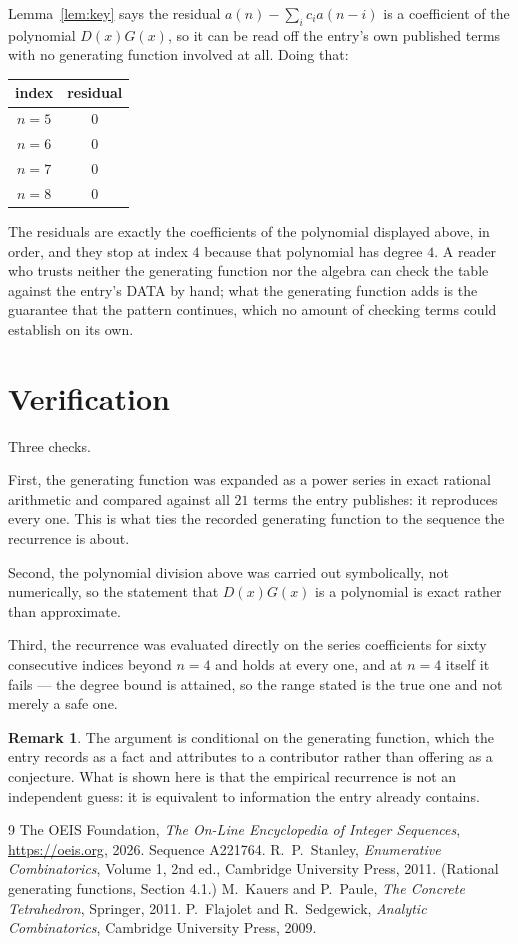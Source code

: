 \documentclass[11pt,a4paper]{article}
\theoremstyle{plain}
\theoremstyle{definition}
\newtheorem{remark}[theorem]{Remark}
\begin{document}
Lemma~\ref{lem:key} says the residual $a(n)-\sum_ic_ia(n-i)$ is a coefficient of the
polynomial $D(x)G(x)$, so it can be read off the entry's own published terms with no
generating function involved at all. Doing that:
\begin{center}
\begin{tabular}{cc}
index & residual \\ \hline
$n=5$ & $0$ \\
$n=6$ & $0$ \\
$n=7$ & $0$ \\
$n=8$ & $0$
\end{tabular}
\end{center}
The residuals are exactly the coefficients of the polynomial displayed above, in order, and
they stop at index $4$ because that polynomial has degree $4$. A reader who trusts
neither the generating function nor the algebra can check the table against the entry's DATA
by hand; what the generating function adds is the guarantee that the pattern continues, which
no amount of checking terms could establish on its own.

\section{Verification}

Three checks.

First, the generating function was expanded as a power series in exact rational arithmetic and
compared against all $21$ terms the entry publishes: it reproduces every one. This is
what ties the recorded generating function to the sequence the recurrence is about.

Second, the polynomial division above was carried out symbolically, not numerically, so the
statement that $D(x)G(x)$ is a polynomial is exact rather than approximate.

Third, the recurrence was evaluated directly on the series coefficients for sixty consecutive
indices beyond $n=4$ and holds at every one, and at $n=4$ itself it fails --- the
degree bound is attained, so the range stated is the true one and not merely a safe one.

\begin{remark}
The argument is conditional on the generating function, which the entry records as a fact and
attributes to a contributor rather than offering as a conjecture. What is shown here is that
the empirical recurrence is not an independent guess: it is equivalent to information the
entry already contains.
\end{remark}

\begin{thebibliography}{9}
 The OEIS Foundation, \emph{The On-Line Encyclopedia of Integer
Sequences}, \url{https://oeis.org}, 2026. Sequence A221764.
 R.~P.~Stanley, \emph{Enumerative Combinatorics}, Volume 1, 2nd ed.,
Cambridge University Press, 2011. (Rational generating functions, Section 4.1.)
 M.~Kauers and P.~Paule, \emph{The Concrete Tetrahedron}, Springer, 2011.
 P.~Flajolet and R.~Sedgewick, \emph{Analytic Combinatorics}, Cambridge
University Press, 2009.
\end{thebibliography}
\end{document}
